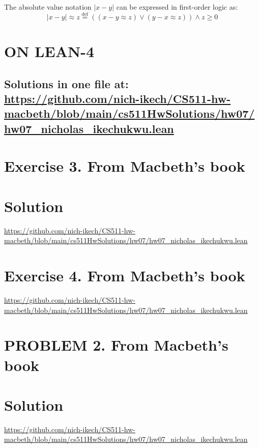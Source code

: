 \documentclass{article}
\newcommand{\defeq}{\stackrel{\text{def}}{=}}
\begin{document}
The absolute value notation $|x - y|$ can be expressed in first-order logic as:
\[ |x - y| \approx z \defeq ((x - y \approx z) \vee (y - x \approx z)) \wedge z \geq 0 \]


\newpage







\section*{ON LEAN-4}
\subsection*{Solutions in one file at: 
\url{https://github.com/nich-ikech/CS511-hw-macbeth/blob/main/cs511HwSolutions/hw07/hw07_nicholas_ikechukwu.lean}}

\newpage

\section*{Exercise 3. From Macbeth's book}
\section*{Solution}
\url{https://github.com/nich-ikech/CS511-hw-macbeth/blob/main/cs511HwSolutions/hw07/hw07_nicholas_ikechukwu.lean}

\newpage

\section*{Exercise 4. From Macbeth's book}

\url{https://github.com/nich-ikech/CS511-hw-macbeth/blob/main/cs511HwSolutions/hw07/hw07_nicholas_ikechukwu.lean}

\newpage

\section*{PROBLEM 2. From Macbeth's book}
\section*{Solution}

\url{https://github.com/nich-ikech/CS511-hw-macbeth/blob/main/cs511HwSolutions/hw07/hw07_nicholas_ikechukwu.lean}
\end{document}
